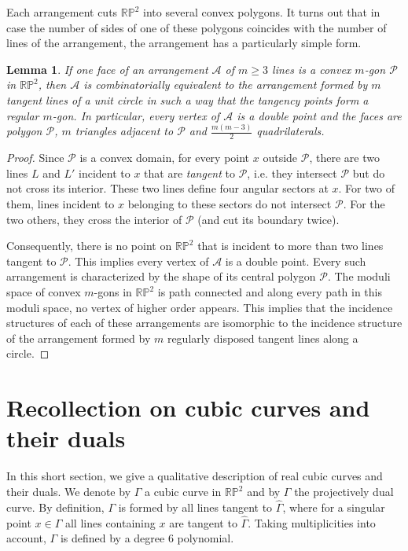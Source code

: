 \documentclass[a4paper,11pt,reqno]{amsart}
\newtheorem{lem}[thm]{Lemma}
\theoremstyle{definition}
\theoremstyle{remark}
\theoremstyle{definition}
\theoremstyle{definition}
\theoremstyle{definition}
\numberwithin{equation}{section}
\begin{document}
Each arrangement cuts $\mathbb {RP}^2$ into several convex polygons. It turns out that in case the number of sides of one of these polygons coincides with the number of lines of the arrangement, the arrangement has a particularly simple form.

\begin{lem}\label{lem:centralpolygon}
If one face of an arrangement $\mathcal{A}$ of $m \geq 3$ lines is a convex $m$-gon $\mathcal{P}$ in $\mathbb{RP}^{2}$, then $\mathcal{A}$ is combinatorially equivalent to the arrangement formed by $m$ tangent lines of a unit circle in such a way that the tangency points form a regular $m$-gon. In particular, every vertex of $\mathcal{A}$ is a double point and the faces are polygon $\mathcal{P}$, $m$ triangles adjacent to $\mathcal{P}$ and $\frac{m(m-3)}{2}$ quadrilaterals.
\end{lem}

\begin{proof}
Since $\mathcal{P}$ is a convex domain, for every point $x$ outside $\mathcal{P}$, there are two lines $L$ and $L'$ incident to $x$ that are {\it tangent} to $\mathcal{P}$, i.e. they intersect $\mathcal{P}$ but do not cross its interior. These two lines define four angular sectors at $x$. For two of them, lines incident to $x$ belonging to these sectors do not intersect $\mathcal{P}$. For the two others, they cross the interior of $\mathcal{P}$ (and cut its boundary twice).
\par
Consequently, there is no point on $\mathbb{RP}^{2}$ that is incident to more than two lines tangent to $\mathcal{P}$. This implies every vertex of $\mathcal{A}$ is a double point. Every such arrangement is characterized by the shape of its central polygon $\mathcal{P}$. The moduli space of convex $m$-gons in $\mathbb{RP}^{2}$ is path connected and along every path in this moduli space, no vertex of higher order appears. This implies that the incidence structures of each of these arrangements are isomorphic to the incidence structure of the arrangement formed by $m$ regularly disposed tangent lines along a circle.
\end{proof}

\section{Recollection on cubic curves and their duals}\label{sub:classification}
In this short section, we give a qualitative description of real cubic curves and their duals. We denote by $\hat\Gamma$ a cubic curve in $\mathbb{RP}^{2}$ and by $\Gamma$ the projectively dual curve. By definition, $\Gamma$ is formed by all lines tangent to $\hat\Gamma$, where for a singular point  $x\in\hat\Gamma$ all lines containing $x$ are tangent to $\hat\Gamma$. Taking multiplicities into account, $\Gamma$ is defined by a degree $6$ polynomial. 
\end{document}
